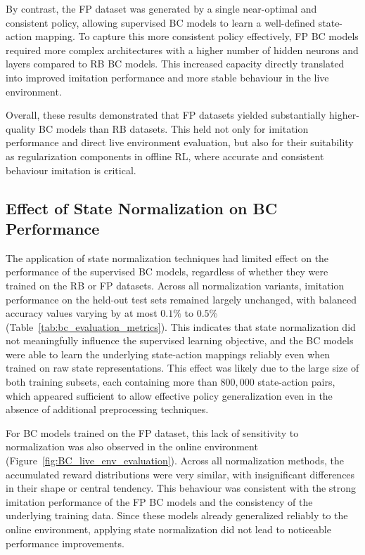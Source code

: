By contrast, the FP dataset was generated by a single near-optimal and consistent policy, allowing supervised BC models to learn a well-defined state-action mapping. To capture this more consistent policy effectively, FP BC models required more complex architectures with a higher number of hidden neurons and layers compared to RB BC models. This increased capacity directly translated into improved imitation performance and more stable behaviour in the live environment.

Overall, these results demonstrated that FP datasets yielded substantially higher-quality BC models than RB datasets. This held not only for imitation performance and direct live environment evaluation, but also for their suitability as regularization components in offline RL, where accurate and consistent behaviour imitation is critical.







\subsection{Effect of State Normalization on BC Performance}

The application of state normalization techniques had limited effect on the performance of the supervised BC models, regardless of whether they were trained on the RB or FP datasets. Across all normalization variants, imitation performance on the held-out test sets remained largely unchanged, with balanced accuracy values varying by at most $0.1\%$ to $0.5\%$ (Table~\ref{tab:bc_evaluation_metrics}). This indicates that state normalization did not meaningfully influence the supervised learning objective, and the BC models were able to learn the underlying state-action mappings reliably even when trained on raw state representations. This effect was likely due to the large size of both training subsets, each containing more than $800,000$ state-action pairs, which appeared sufficient to allow effective policy generalization even in the absence of additional preprocessing techniques.

For BC models trained on the FP dataset, this lack of sensitivity to normalization was also observed in the online environment (Figure~\ref{fig:BC_live_env_evaluation}). Across all normalization methods, the accumulated reward distributions were very similar, with insignificant differences in their shape or central tendency. This behaviour was consistent with the strong imitation performance of the FP BC models and the consistency of the underlying training data. Since these models already generalized reliably to the online environment, applying state normalization did not lead to noticeable performance improvements.

